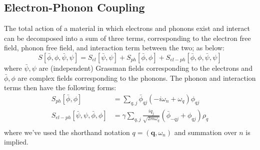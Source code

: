 \documentclass[10pt,a4paper]{article}
\begin{document}
\begin{multicols}{2}
\section{Electron-Phonon Coupling}
The total action of a material in which electrons and phonons exist and interact can be decomposed into a sum of three terms, corresponding to the electron free field, phonon free field, and interaction term between the two; as below:\small
$$
S[\bar{\phi},\phi,\bar{\psi},\psi]=S_{el}[\bar{\psi},\psi]+S_{ph}[\bar{\phi},\phi]+S_{el-ph}[\bar{\phi},\phi,\bar{\psi},\psi]
$$\normalsize
where $\bar{\psi},\psi$ are (independent) Grassman fields corresponding to the electrons and $\bar{\phi},\phi$ are complex fields corresponding to the phonons. The phonon and interaction terms then have the following forms:
\begin{align*}
S_{ph}[\bar{\phi},\phi]&=\sum_{q,j}\bar{\phi}_{qj}(-i\omega_n + \omega_q)\phi_{qj}\\
S_{el-ph}[\bar{\psi},\psi,\bar{\phi},\phi]&=\gamma\sum_{q,j}\frac{i q_j}{\sqrt{2m\omega_q}}(\bar{\phi}_{-qj}+\phi_{qj})\rho_q\\
\end{align*}
where we've used the shorthand notation $q=(\mathbf{q},\omega_n)$ and summation over $n$ is implied.


\end{multicols}
\end{document}
